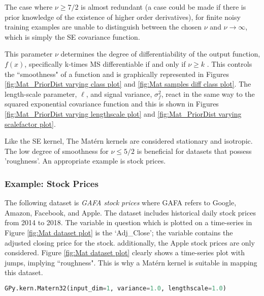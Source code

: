 \documentclass[12pt,a4paper]{article}
\begin{document}
The case where \(\nu \geq 7/2\) is almost redundant (a case could be made if there is prior knowledge of the existence of higher order derivatives), for finite noisy training examples are unable to distinguish between the chosen \(\nu\) and \(\nu \to \infty\), which is simply the SE covariance function.

This parameter \(\nu\) determines the degree of differentiability of the output function, \(f(x)\), specifically k-times MS differentiable if and only if \(\nu\geq k\) \citep[see Section 2.3.4, Example 2.5]{Santner2003}. This controls the ``smoothness" of a function and is graphically represented in Figures \ref{fig:Mat_PriorDist varying class plot} and \ref{fig:Mat samples diff class plot}. The length-scale parameter, \( \ell \), and signal variance, \( \sigma_f^2 \),  react in the same way to the squared exponential covariance function and this is shown in Figures \ref{fig:Mat_PriorDist varying lengthscale plot} and \ref{fig:Mat_PriorDist varying scalefactor plot}. 

Like the SE kernel, The Mat\'{e}rn kernels are considered stationary and isotropic. The low degree of smoothness for \(\nu \leq 5/2\) is beneficial for datasets that possess 'roughness'. An appropriate example is stock prices.

\subsubsection{Example: Stock Prices}

The following dataset is \textit{GAFA stock prices} where GAFA refers to Google, Amazon, Facebook, and Apple. The dataset includes historical daily stock prices from 2014 to 2018. The variable in question which is plotted on a time-series in Figure \ref{fig:Mat dataset plot} is the `Adj\_Close'; the variable contains the adjusted closing price for the stock. additionally, the Apple stock prices are only considered. Figure \ref{fig:Mat dataset plot} clearly shows a time-series plot with jumps, implying ``roughness". This is why a Mat\'{e}rn kernel is suitable in mapping this dataset.



\vspace{10pt}
\begin{lstlisting}[language=python, caption={Code of creating the Mat\'{e}rn kernel (\(\nu = 3/2\))}, label={lst:Mat kernel.}]
GPy.kern.Matern32(input_dim=1, variance=1.0, lengthscale=1.0)
\end{lstlisting}
\end{document}
